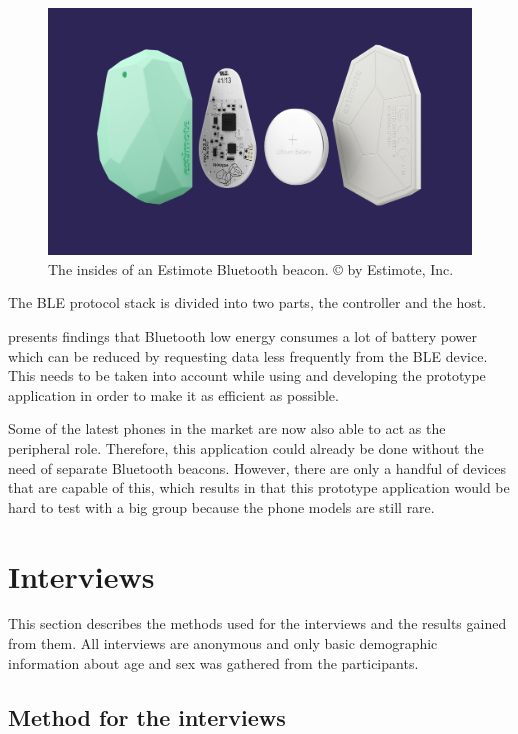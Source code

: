 \begin{figure}[htb]
	\begin{center}
		\includegraphics[width=1\textwidth]{estimote_beacons.jpg}
		\caption{The insides of an Estimote Bluetooth beacon. © by Estimote, Inc.}
	\end{center}
\end{figure}

The BLE protocol stack is divided into two parts, the controller and the host.

\citep{bluetoothOverview} presents findings that Bluetooth low energy consumes a lot of battery power which can be reduced by requesting data less frequently from the BLE device. This needs to be taken into account while using and developing the prototype application in order to make it as efficient as possible.

Some of the latest phones in the market are now also able to act as the peripheral role. Therefore, this application could already be done without the need of separate Bluetooth beacons. However, there are only a handful of devices that are capable of this, which results in that this prototype application would be hard to test with a big group because the phone models are still rare.

\section{Interviews}

This section describes the methods used for the interviews and the results gained from them. All interviews are anonymous and only basic demographic information about age and sex was gathered from the participants.

\subsection{Method for the interviews}

